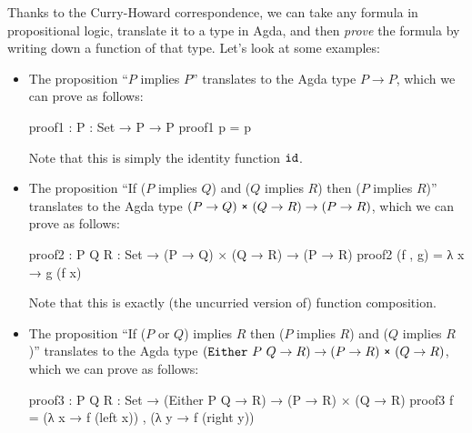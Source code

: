 \documentclass[a4paper,UKenglish]{tufte-handout}
\theoremstyle{definition}
\newtheorem{exercise}{Exercise}[section]
\newcommand\fun[1]{{\AgdaFunction{#1}}}
\newcommand\data[1]{{\AgdaFunction{#1}}}
\renewcommand\prod{\data{×}}
\begin{document}
Thanks to the Curry-Howard correspondence, we can take any formula in
propositional logic, translate it to a type in Agda, and then
\emph{prove} the formula by writing down a function of that
type. Let's look at some examples:
\begin{itemize}

\item The proposition ``$P$ implies $P$'' translates to the Agda type
$P \to P$, which we can prove as follows:
\begin{code}[number]
proof1 : {P : Set} → P → P
proof1 p = p
\end{code}
Note that this is simply the identity function $\fun{id}$.

\item The proposition ``If ($P$ implies $Q$) and ($Q$ implies $R$)
then ($P$ implies $R$)'' translates to the Agda type $(P \to Q)\
\prod\ (Q \to R) \to (P \to R)$, which we can prove as follows:
\begin{code}[number]
proof2 : {P Q R : Set} → (P → Q) × (Q → R) → (P → R)
proof2 (f , g) = λ x → g (f x)
\end{code}
Note that this is exactly (the uncurried version of) function composition.

\item The proposition ``If ($P$ or $Q$) implies $R$ then ($P$ implies
$R$) and ($Q$ implies $R$)'' translates to the Agda type
$(\data{Either}\ P\ Q \to R) \to (P \to R)\ \prod\ (Q \to R)$, which
we can prove as follows:
\begin{code}[number]
proof3 : {P Q R : Set}
       → (Either P Q → R) → (P → R) × (Q → R)
proof3 f = (λ x → f (left x)) , (λ y → f (right y))
\end{code}

\end{itemize}

\end{document}
